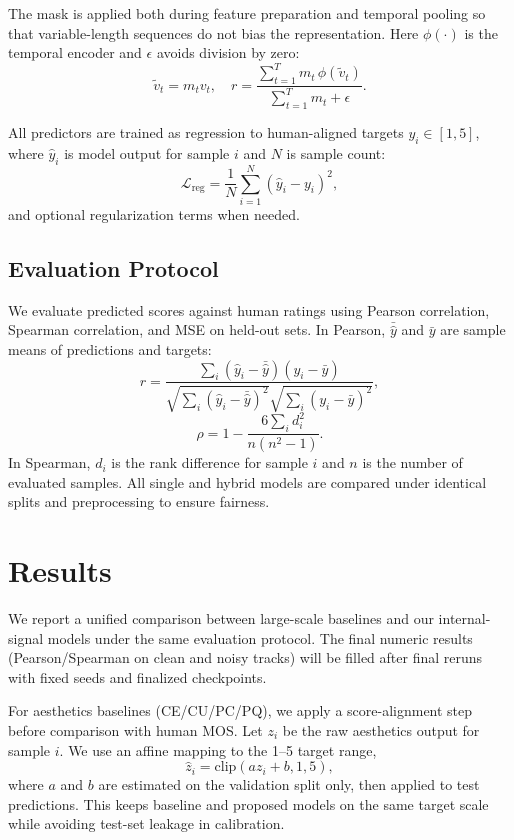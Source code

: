 \documentclass{article}
\begin{document}
The mask is applied both during feature preparation and temporal pooling
so that variable-length sequences do not bias the representation.
Here $\phi(\cdot)$ is the temporal encoder and $\epsilon$ avoids division by zero:
\begin{equation}
\tilde{v}_t=m_t v_t,\quad
r=\frac{\sum_{t=1}^{T} m_t\,\phi(\tilde{v}_t)}{\sum_{t=1}^{T} m_t+\epsilon}.
\end{equation}

All predictors are trained as regression to human-aligned targets $y_i\in[1,5]$,
where $\hat{y}_i$ is model output for sample $i$ and $N$ is sample count:
\begin{equation}
\mathcal{L}_{\text{reg}}=\frac{1}{N}\sum_{i=1}^{N}(\hat{y}_i-y_i)^2,
\end{equation}
and optional regularization terms when needed.

\subsection{Evaluation Protocol}

We evaluate predicted scores against human ratings
using Pearson correlation, Spearman correlation, and MSE on held-out sets.
In Pearson, $\bar{\hat{y}}$ and $\bar{y}$ are sample means of predictions and targets:
\begin{equation}
r=\frac{\sum_i(\hat{y}_i-\bar{\hat{y}})(y_i-\bar{y})}
{\sqrt{\sum_i(\hat{y}_i-\bar{\hat{y}})^2}\sqrt{\sum_i(y_i-\bar{y})^2}},
\end{equation}
\begin{equation}
\rho=1-\frac{6\sum_i d_i^2}{n(n^2-1)}.
\end{equation}
In Spearman, $d_i$ is the rank difference for sample $i$
and $n$ is the number of evaluated samples.
All single and hybrid models are compared
under identical splits and preprocessing to ensure fairness.

\section{Results}\label{sec:results}

We report a unified comparison
between large-scale baselines and our internal-signal models
under the same evaluation protocol.
The final numeric results (Pearson/Spearman on clean and noisy tracks)
will be filled after final reruns with fixed seeds and finalized checkpoints.

For aesthetics baselines (CE/CU/PC/PQ),
we apply a score-alignment step before comparison with human MOS.
Let $z_i$ be the raw aesthetics output for sample $i$.
We use an affine mapping to the 1--5 target range,
\begin{equation}
\hat{z}_i=\mathrm{clip}(a z_i+b,1,5),
\end{equation}
where $a$ and $b$ are estimated on the validation split only,
then applied to test predictions.
This keeps baseline and proposed models on the same target scale
while avoiding test-set leakage in calibration.
\end{document}
